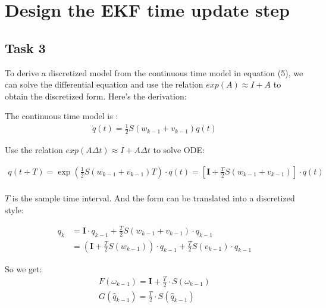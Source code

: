 \section{Design the EKF time update step}

\subsection{Task 3}

To derive a discretized model from the continuous time model in equation (5), we can solve the differential equation and use the relation $exp(A) \approx I + A$ to obtain the discretized form. Here's the derivation:

The continuous time model is :
\begin{equation}
    \begin{aligned}
        \dot q(t)=\frac12S\left(w_{k-1}+v_{k-1}\right)q(t)
    \end{aligned}
\end{equation}

Use the relation $exp(AΔt) \approx I + AΔt$ to solve ODE:

\begin{equation}
    \begin{aligned}
        q(t+T)=\exp\left(\frac{1}{2}S\left(w_{k-1}+v_{k-1}\right)T\right)\cdot q(t) = \left[\mathbf{I}+{\frac{T}{2}}S\left(w_{k-1}+v_{k-1}\right)\right]\cdot q(t)\\
    \end{aligned}
\end{equation}

$T $ is the sample time interval. And the form can be translated into a discretized style:

\begin{equation}
    \begin{aligned}
        q_k&=\mathbf{I}\cdot q_{k-1}+\frac{T}{2}S\left(w_{k-1}+v_{k-1}\right)\cdot q_{k-1}\\
        &=\left(\mathbf{I}+{\frac{T}{2}}S\left(w_{k-1}\right)\right)\cdot q_{k-1}+{\frac{T}{2}}S\left(v_{k-1}\right)\cdot q_{k-1}
    \end{aligned}
\end{equation}

So we get:
\begin{equation}
    \begin{aligned}
        F(\omega_{k-1}) = \mathbf{I}  + \frac{T}{2}\cdot S(\omega_{k-1})\\
G(\hat{q}_{k-1}) = \frac{T}{2} \cdot S(\hat{q}_{k-1})\\
    \end{aligned}
\end{equation}




